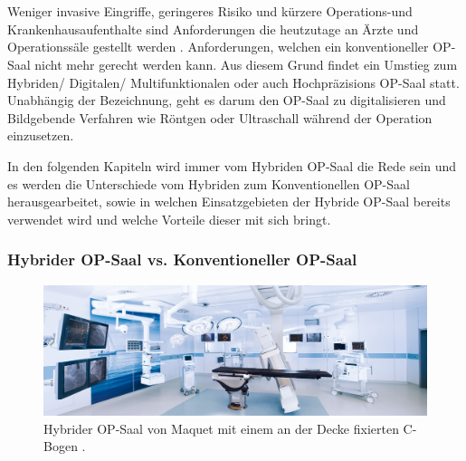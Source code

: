 \chapter{}
\label{sec:overview}

Weniger invasive Eingriffe, geringeres Risiko und kürzere Operations-und Krankenhausaufenthalte sind Anforderungen die heutzutage an Ärzte und Operationssäle gestellt werden \cite{DerDigitaleOperationssaal}. Anforderungen, welchen ein konventioneller OP-Saal nicht mehr gerecht werden kann. Aus diesem Grund findet ein Umstieg zum Hybriden/ Digitalen/ Multifunktionalen oder auch Hochpräzisions OP-Saal statt. Unabhängig der Bezeichnung, geht es darum den OP-Saal zu digitalisieren und Bildgebende Verfahren wie Röntgen oder Ultraschall während der Operation einzusetzen.

In den folgenden Kapiteln wird immer vom Hybriden OP-Saal die Rede sein und es werden die Unterschiede vom Hybriden zum Konventionellen OP-Saal herausgearbeitet, sowie in welchen Einsatzgebieten der Hybride OP-Saal bereits verwendet wird und welche Vorteile dieser mit sich bringt.

\subsection{Hybrider OP-Saal vs. Konventioneller OP-Saal} 

\begin{figure} [H]
	\includegraphics[scale = .3]{Content/Pictures/hybrid-or.png}
	\caption{Hybrider OP-Saal von Maquet mit einem an der Decke fixierten C-Bogen \cite{Maquet}.}
	\label{fig:hybridor}
\end{figure}


